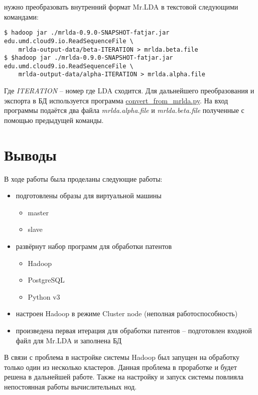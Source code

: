 нужно преобразовать внутренний формат Mr.LDA в текстовой следующими командами:
\begin{lstlisting}
$ hadoop jar ./mrlda-0.9.0-SNAPSHOT-fatjar.jar edu.umd.cloud9.io.ReadSequenceFile \
    mrlda-output-data/beta-ITERATION > mrlda.beta.file
$ $hadoop jar ./mrlda-0.9.0-SNAPSHOT-fatjar.jar edu.umd.cloud9.io.ReadSequenceFile \
    mrlda-output-data/alpha-ITERATION > mrlda.alpha.file
\end{lstlisting}
Где \emph{ITERATION} -- номер где LDA сходится. Для дальнейшего преобразования и экспорта в БД используется 
программа 
\href{https://github.com/SemPatent/Golubev/blob/master/convert_from_mrlda.py}{convert\_from\_mrlda.py}. На 
вход программы подаётся два файла \emph{mrlda.alpha.file} и \emph{mrlda.beta.file} полученные с помощью 
предыдущей команды.

\newpage

\section{Выводы}
В ходе работы была проделаны следующие работы:
\begin{itemize}
    \item подготовлены образы для виртуальной машины
    \begin{itemize}
        \item master
        \item slave
    \end{itemize}
    \item развёрнут набор программ для обработки патентов
    \begin{itemize}
        \item Hadoop
        \item PostgreSQL
        \item Python v3
    \end{itemize}
    \item настроен Hadoop в режиме Cluster node (неполная работоспособность)
    \item произведена первая итерация для обработки патентов -- подготовлен входной файл 
        для Mr.LDA и заполнена БД
\end{itemize}
В связи с проблема в настройке системы Hadoop был запущен на обработку только один из несколько кластеров.
Данная проблема в проработке и будет решена в дальнейшей работе. Также на настройку и запуск системы 
повлияла непостоянная работы вычислительных нод.

